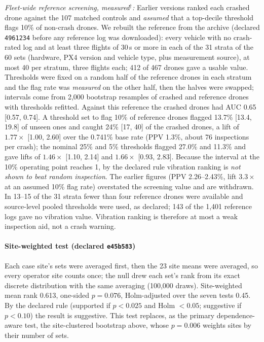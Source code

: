 \documentclass[preprint,12pt]{elsarticle}
\begin{document}
\emph{Fleet-wide reference screening, measured$^\dagger$:} Earlier versions ranked each crashed drone against the 107 matched controls and \emph{assumed} that a top-decile threshold flags 10\% of non-crash drones. We rebuilt the reference from the archive (declared \texttt{4961234} before any reference log was downloaded): every vehicle with no crash-rated log and at least three flights of 30\,s or more in each of the 31 strata of the 60 sets (hardware, PX4 version and vehicle type, plus measurement source), at most 40 per stratum, three flights each; 412 of 467 drones gave a usable value. Thresholds were fixed on a random half of the reference drones in each stratum and the flag rate was \emph{measured} on the other half, then the halves were swapped; intervals come from 2,000 bootstrap resamples of crashed and reference drones with thresholds refitted. Against this reference the crashed drones had AUC 0.65 [0.57, 0.74]. A threshold set to flag 10\% of reference drones flagged 13.7\% [13.4, 19.8] of unseen ones and caught 24\% [17, 40] of the crashed drones, a lift of $1.77\times$ [1.00, 2.60] over the 0.741\% base rate (PPV 1.3\%, about 76 inspections per crash); the nominal 25\% and 5\% thresholds flagged 27.0\% and 11.3\% and gave lifts of $1.46\times$ [1.10, 2.14] and $1.66\times$ [0.93, 2.83]. Because the interval at the 10\% operating point reaches 1, by the declared rule vibration ranking is \emph{not shown to beat random inspection}. The earlier figures (PPV 2.26--2.43\%, lift $3.3\times$ at an assumed 10\% flag rate) overstated the screening value and are withdrawn. In 13--15 of the 31 strata fewer than four reference drones were available and source-level pooled thresholds were used, as declared; 143 of the 1,401 reference logs gave no vibration value. Vibration ranking is therefore at most a weak inspection aid, not a crash warning.

\paragraph{Site-weighted test (declared \texttt{e45b583})} Each case site's sets were averaged first, then the 23 site means were averaged, so every operator site counts once; the null drew each set's rank from its exact discrete distribution with the same averaging (100,000 draws). Site-weighted mean rank 0.613, one-sided $p=0.076$, Holm-adjusted over the seven tests 0.45. By the declared rule (supported if $p<0.025$ and Holm $<0.05$; suggestive if $p<0.10$) the result is suggestive. This test replaces, as the primary dependence-aware test, the site-clustered bootstrap above, whose $p=0.006$ weights sites by their number of sets.
\end{document}
